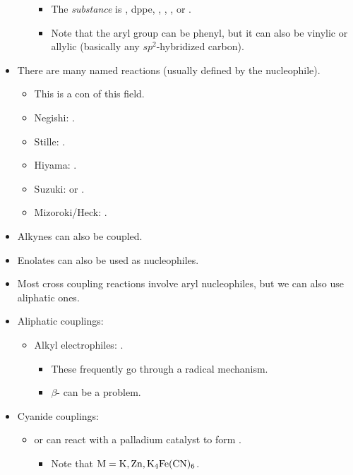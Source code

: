 \documentclass[../notes.tex]{subfiles}
\begin{document}
\begin{itemize}
\begin{itemize}
        \begin{itemize}
            \item The \emph{substance} is , dppe, , , , or .
            \item Note that the aryl group can be phenyl, but it can also be vinylic or allylic (basically any $sp^2$-hybridized carbon).
        \end{itemize}
    \end{itemize}
    \item There are many named reactions (usually defined by the nucleophile).
    \begin{itemize}
        \item This is a con of this field.
        \item Negishi: .
        \item Stille: .
        \item Hiyama: .
        \item Suzuki:  or .
        \item Mizoroki/Heck: .
    \end{itemize}
    \item Alkynes can also be coupled.
    \item Enolates can also be used as nucleophiles.
    \item Most cross coupling reactions involve aryl nucleophiles, but we can also use aliphatic ones.
    \item Aliphatic couplings:
    \begin{itemize}
        \item Alkyl electrophiles: .
        \begin{itemize}
            \item These frequently go through a radical mechanism.
            \item $\beta$- can be a problem.
        \end{itemize}
    \end{itemize}
    \item Cyanide couplings:
    \begin{itemize}
        \item {} or  can react with a palladium catalyst to form .
        \begin{itemize}
            \item Note that $\ce{M}=\ce{K},\ce{Zn},\ce{K4Fe(CN)6}$.

\end{itemize}
\end{itemize}
\end{itemize}
\end{document}
